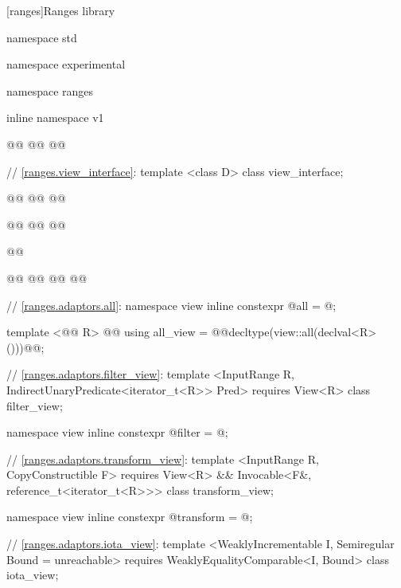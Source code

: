 
\setcounter{chapter}{9}
[ranges]{Ranges library}


\begin{codeblock}
namespace std { namespace experimental { namespace ranges { inline namespace v1 {
  @\added{// \ref{ranges.viewable}:}@
  @@
  @@

  // \ref{ranges.view_interface}:
  template <class D>
  class view_interface;

  @@
  @@
  @@

  @@
  @@
  @@

  @@

  @\added{// \ref{ranges.subrange}:}@
  @@
    @@
  @@

  // \ref{ranges.adaptors.all}:
  namespace view { inline constexpr @\unspec@ all = @\unspec@; }

  template <@@ R>
    @@
  using all_view = @@decltype(view::all(declval<R>()))@\removed{>}@;

  // \ref{ranges.adaptors.filter_view}:
  template <InputRange R, IndirectUnaryPredicate<iterator_t<R>> Pred>
    requires View<R>
  class filter_view;

  namespace view { inline constexpr @\unspec@ filter = @\unspec@; }

  // \ref{ranges.adaptors.transform_view}:
  template <InputRange R, CopyConstructible F>
    requires View<R> && Invocable<F&, reference_t<iterator_t<R>>>
  class transform_view;

  namespace view { inline constexpr @\unspec@ transform = @\unspec@; }

  // \ref{ranges.adaptors.iota_view}:
  template <WeaklyIncrementable I, Semiregular Bound = unreachable>
    requires WeaklyEqualityComparable<I, Bound>
  class iota_view;

}}}}
\end{codeblock}
